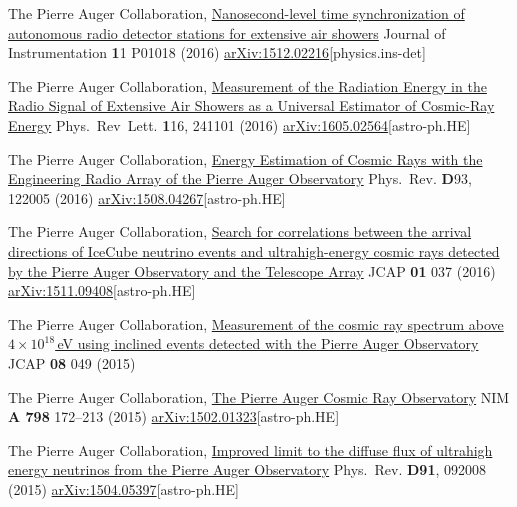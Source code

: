 \begin{etaremune}
\item {}The Pierre Auger Collaboration, \href{http://iopscience.iop.org/article/10.1088/1748-0221/11/01/P01018}{{Nanosecond-level time synchronization of autonomous radio detector stations for extensive air showers}} Journal of Instrumentation {\textbf 11} P01018 (2016) \href{http://arxiv.org/abs/1512.02216}{arXiv:1512.02216}[physics.ins-det]

\item {}The Pierre Auger Collaboration, \href{http://journals.aps.org/prl/abstract/10.1103/PhysRevLett.116.241101}{{Measurement of the Radiation Energy in the Radio Signal of Extensive Air Showers as a Universal Estimator of Cosmic-Ray Energy}} Phys.\ Rev\  Lett. {\textbf 116}, 241101 (2016) \href{http://arxiv.org/abs/1605.02564}{arXiv:1605.02564}[astro-ph.HE]

\item {}The Pierre Auger Collaboration, \href{http://journals.aps.org/prd/abstract/10.1103/PhysRevD.93.122005}{{Energy Estimation of Cosmic Rays with the Engineering Radio Array of the Pierre Auger Observatory}} Phys.\ Rev. {\textbf D93}, 122005 (2016) \href{http://arxiv.org/abs/1508.04267}{arXiv:1508.04267}[astro-ph.HE]

\item {}The Pierre Auger Collaboration, \href{http://dx.doi.org/10.1088/1475-7516/2016/01/037}{{Search for correlations between the arrival directions of IceCube neutrino events and ultrahigh-energy cosmic rays detected by the Pierre Auger Observatory and the Telescope Array}} JCAP {\textbf{01}} 037 (2016) \href{http://arxiv.org/abs/1511.09408}{arXiv:1511.09408}[astro-ph.HE]

\item {}The Pierre Auger Collaboration, \href{http://dx.doi.org/10.1088/1475-7516/2015/08/049}{{Measurement of the cosmic ray spectrum above $4\times 10^{18}$\,eV using inclined events detected with the Pierre Auger Observatory}} JCAP {\textbf{08}} 049 (2015) %

\item {}The Pierre Auger Collaboration, \href{http://dx.doi.org/10.1016/j.nima.2015.06.058}{{The Pierre Auger Cosmic Ray Observatory}} NIM {\textbf{A 798}} 172--213 (2015) \href{http://arxiv.org/abs/1502.01323}{arXiv:1502.01323}[astro-ph.HE]

\item {}The Pierre Auger Collaboration, \href{http://dx.doi.org/10.1103/PhysRevD.91.092008}{{Improved limit to the diffuse flux of ultrahigh energy neutrinos from the Pierre Auger Observatory}} Phys.\ Rev. {\textbf{D91}}, 092008 (2015) \href{http://arxiv.org/abs/1504.05397}{arXiv:1504.05397}[astro-ph.HE]


\end{etaremune}
